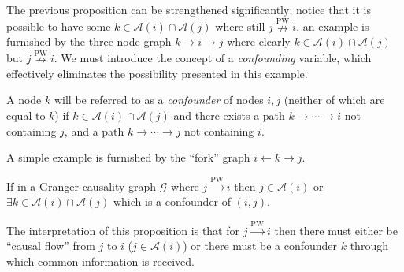 \documentclass[12pt]{article}
\def\pwgc{\overset{\text{PW}}{\rightarrow}}  %
\def\npwgc{\overset{\text{PW}}{\nrightarrow}}  %
\def\gcg{\mathcal{G}}  %
\newcommand{\anc}[1]{\mathcal{A}(#1)}  %
\newcommand{\gcgpath}[2]{#1 \rightarrow \cdots \rightarrow #2}  %
\begin{document}
The previous proposition can be strengthened significantly; notice
that it is possible to have some $k \in \anc{i} \cap \anc{j}$ where still
$j \npwgc i$, an example is furnished by the three node graph
$k \rightarrow i \rightarrow j$ where clearly
$k \in \anc{i}\cap\anc{j}$ but $j \npwgc i$.  We must introduce the concept
of a \textit{confounding} variable, which effectively eliminates the
possibility presented in this example.

\begin{definition}[Confounder]
  A node $k$ will be referred to as a \textit{confounder} of nodes
  $i, j$ (neither of which are equal to $k$) if
  $k \in \anc{i} \cap \anc{j}$ and there exists a path
  $\gcgpath{k}{i}$ not containing $j$, and a path $\gcgpath{k}{j}$
  not containing $i$.

  A simple example is furnished by the ``fork'' graph
  $i \leftarrow k \rightarrow j$.
\end{definition}

\begin{proposition}
  \label{prop:ancestor_properties}
  If in a Granger-causality graph $\gcg$ where $j \pwgc i$ then
  $j \in \anc{i}$ or $\exists k \in \anc{i} \cap\anc{j}$ which is a
  confounder of $(i, j)$.
\end{proposition}

\begin{remark}
  The interpretation of this proposition is that for $j \pwgc i$ then
  there must either be ``causal flow'' from $j$ to $i$
  ($j \in \anc{i}$) or there must be a confounder $k$ through which
  common information is received.
\end{remark}
\end{document}
